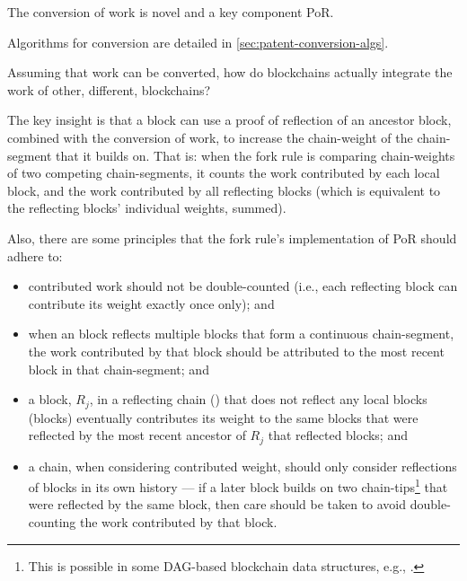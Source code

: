 \documentclass[a4paper,]{article}
\begin{document}
The conversion of work is novel and a key component PoR.

Algorithms for conversion are detailed in \autoref{sec:patent-conversion-algs}.

Assuming that work can be converted, how do blockchains actually integrate the work of other, different, blockchains?

The key insight is that a block can use a proof of reflection of an ancestor block, combined with the conversion of work, to increase the chain-weight of the chain-segment that it builds on.
That is: when the fork rule is comparing chain-weights of two competing chain-segments, it counts the work contributed by each local block, and the work contributed by all reflecting blocks (which is equivalent to the reflecting blocks' individual weights, summed).

Also, there are some principles that the fork rule's implementation of PoR should adhere to:
\begin{itemize}
  \item contributed work should not be double-counted (i.e., each reflecting block can contribute its weight exactly once only); and
  \item when an \cR block reflects multiple \cL blocks that form a continuous chain-segment, the work contributed by that \cR block should be attributed to the most recent \cL block in that chain-segment; and
  \item a block, $R_j$, in a reflecting chain (\cR) that does not reflect any local blocks (\cL blocks) eventually contributes its weight to the same \cL blocks that were reflected by the most recent ancestor of $R_j$ that reflected \cL blocks; and
  \item a chain, when considering contributed weight, should only consider reflections of blocks in its own history --- if a later block builds on two chain-tips\footnote{
    This is possible in some DAG-based blockchain data structures, e.g., \citeInclusiveFull.
  } that were reflected by the same \cR block, then care should be taken to avoid double-counting the work contributed by that \cR block.
\end{itemize}
\end{document}
